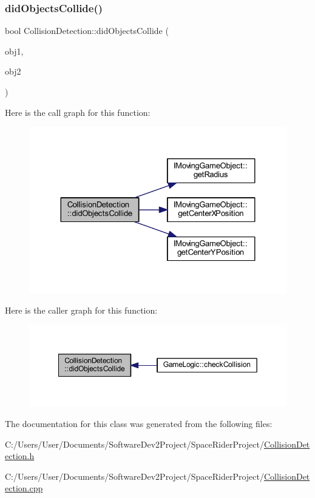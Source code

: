 \subsubsection{\texorpdfstring{did\+Objects\+Collide()}{didObjectsCollide()}}
{\footnotesize\ttfamily bool Collision\+Detection\+::did\+Objects\+Collide (\begin{DoxyParamCaption}\item[{\hyperlink{class_i_moving_game_object}{I\+Moving\+Game\+Object} \&}]{obj1,  }\item[{\hyperlink{class_i_moving_game_object}{I\+Moving\+Game\+Object} \&}]{obj2 }\end{DoxyParamCaption})}

Here is the call graph for this function\+:\nopagebreak
\begin{figure}[H]
\begin{center}
\leavevmode
\includegraphics[width=324pt]{class_collision_detection_a8e58e83acc7de60673126754ac2246cd_cgraph}
\end{center}
\end{figure}
Here is the caller graph for this function\+:\nopagebreak
\begin{figure}[H]
\begin{center}
\leavevmode
\includegraphics[width=349pt]{class_collision_detection_a8e58e83acc7de60673126754ac2246cd_icgraph}
\end{center}
\end{figure}


The documentation for this class was generated from the following files\+:\begin{DoxyCompactItemize}
\item 
C\+:/\+Users/\+User/\+Documents/\+Software\+Dev2\+Project/\+Space\+Rider\+Project/\hyperlink{_collision_detection_8h}{Collision\+Detection.\+h}\item 
C\+:/\+Users/\+User/\+Documents/\+Software\+Dev2\+Project/\+Space\+Rider\+Project/\hyperlink{_collision_detection_8cpp}{Collision\+Detection.\+cpp}\end{DoxyCompactItemize}
